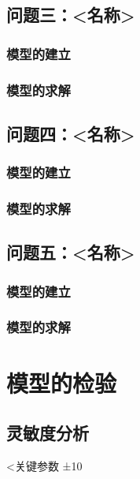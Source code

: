 \documentclass[11pt]{ctexart}
\begin{document}
\subsection{问题三：<名称>}
\subsubsection{模型的建立}
\subsubsection{模型的求解}

\subsection{问题四：<名称>}
\subsubsection{模型的建立}
\subsubsection{模型的求解}

\subsection{问题五：<名称>}
\subsubsection{模型的建立}
\subsubsection{模型的求解}

\section{模型的检验}
\subsection{灵敏度分析}
<关键参数 ±10%
\end{document}
